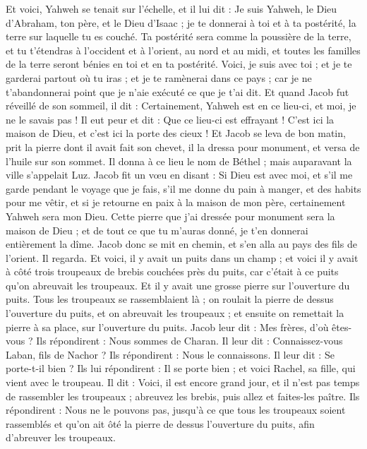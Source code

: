 \begin{multicols}{2}
Et voici, Yahweh se tenait sur l'échelle, et il lui dit : Je suis Yahweh, le Dieu d'Abraham, ton père, et le Dieu d'Isaac ; je te donnerai à toi et à ta postérité, la terre sur laquelle tu es couché.
Ta postérité sera comme la poussière de la terre, et tu t'étendras à l'occident et à l'orient, au nord et au midi, et toutes les familles de la terre seront bénies en toi et en ta postérité.
Voici, je suis avec toi ; et je te garderai partout où tu iras ; et je te ramènerai dans ce pays ; car je ne t'abandonnerai point que je n'aie exécuté ce que je t'ai dit.
Et quand Jacob fut réveillé de son sommeil, il dit : Certainement, Yahweh est en ce lieu-ci, et moi, je ne le savais pas !
Il eut peur et dit : Que ce lieu-ci est effrayant ! C'est ici la maison de Dieu, et c'est ici la porte des cieux !
Et Jacob se leva de bon matin, prit la pierre dont il avait fait son chevet, il la dressa pour monument, et versa de l'huile sur son sommet.
Il donna à ce lieu le nom de Béthel ; mais auparavant la ville s'appelait Luz.
Jacob fit un vœu en disant : Si Dieu est avec moi, et s'il me garde pendant le voyage que je fais, s'il me donne du pain à manger, et des habits pour me vêtir,
et si je retourne en paix à la maison de mon père, certainement Yahweh sera mon Dieu.
Cette pierre que j'ai dressée pour monument sera la maison de Dieu ; et de tout ce que tu m'auras donné, je t'en donnerai entièrement la dîme.
\VerseOne{}Jacob donc se mit en chemin, et s'en alla au pays des fils de l’orient.
Il regarda. Et voici, il y avait un puits dans un champ ; et voici il y avait à côté trois troupeaux de brebis couchées près du puits, car c’était à ce puits qu’on abreuvait les troupeaux.  Et il y avait une grosse pierre sur l'ouverture du puits.
Tous les troupeaux se rassemblaient là ; on roulait la pierre de dessus l'ouverture du puits, et on abreuvait les troupeaux ; et ensuite on remettait la pierre à sa place, sur l'ouverture du puits.
Jacob leur dit : Mes frères, d'où êtes-vous ? Ils répondirent : Nous sommes de Charan.
Il leur dit : Connaissez-vous Laban, fils de Nachor ? Ils répondirent : Nous le connaissons.
Il leur dit : Se porte-t-il bien ? Ils lui répondirent : Il se porte bien ; et voici Rachel, sa fille, qui vient avec le troupeau.
Il dit : Voici, il est encore grand jour, et il n'est pas temps de rassembler les troupeaux ; abreuvez les brebis, puis allez et faites-les paître.
Ils répondirent : Nous ne le pouvons pas, jusqu'à ce que tous les troupeaux soient rassemblés et qu'on ait ôté la pierre de dessus l'ouverture du puits, afin d'abreuver les troupeaux.

\end{multicols}
